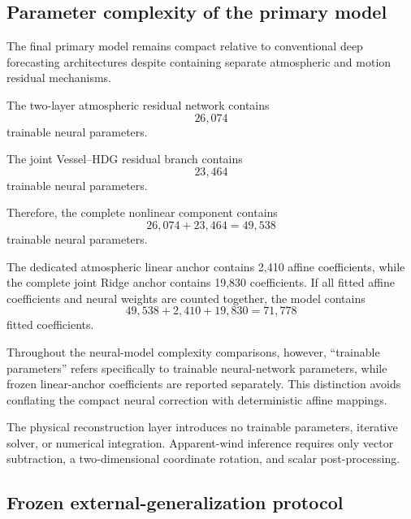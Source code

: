 \subsection{Parameter complexity of the primary model}
\label{subsec:primary_complexity}

The final primary model remains compact relative to conventional deep forecasting architectures despite containing separate atmospheric and motion residual mechanisms.

The two-layer atmospheric residual network contains
\begin{equation}
\boxed{
26{,}074
}
\end{equation}
trainable neural parameters.

The joint Vessel--HDG residual branch contains
\begin{equation}
\boxed{
23{,}464
}
\end{equation}
trainable neural parameters.

Therefore, the complete nonlinear component contains
\begin{equation}
26{,}074
+
23{,}464
=
\boxed{
49{,}538
}
\label{eq:total_neural_params}
\end{equation}
trainable neural parameters.

The dedicated atmospheric linear anchor contains 2,410 affine coefficients, while the complete joint Ridge anchor contains 19,830 coefficients. If all fitted affine coefficients and neural weights are counted together, the model contains
\begin{equation}
49{,}538
+
2{,}410
+
19{,}830
=
\boxed{
71{,}778
}
\label{eq:total_fitted_coefficients}
\end{equation}
fitted coefficients.

Throughout the neural-model complexity comparisons, however, ``trainable parameters'' refers specifically to trainable neural-network parameters, while frozen linear-anchor coefficients are reported separately. This distinction avoids conflating the compact neural correction with deterministic affine mappings.

The physical reconstruction layer introduces no trainable parameters, iterative solver, or numerical integration. Apparent-wind inference requires only vector subtraction, a two-dimensional coordinate rotation, and scalar post-processing.

\subsection{Frozen external-generalization protocol}
\label{subsec:external_protocol}

